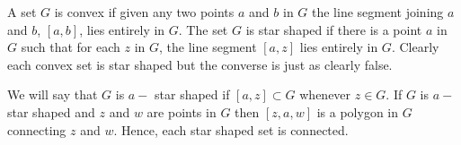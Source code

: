 A set $G$ is convex if given any two points $a$ and $b$ in $G$ the line segment joining $a$ and $b$, $[a, b]$, lies entirely in $G$. The set $G$ is star shaped if there is a point $a$ in $G$ such that for each $z$ in $G$, the line segment $[a, z]$ lies entirely in $G$. Clearly each convex set is star shaped but the converse is just as clearly false.

We will say that $G$ is $a-$ star shaped if $[a, z] \subset G$ whenever $z \in G$. If $G$ is $a-$ star shaped and $z$ and $w$ are points in $G$ then $[z, a, w]$ is a polygon in $G$ connecting $z$ and $w$. Hence, each star shaped set is connected.